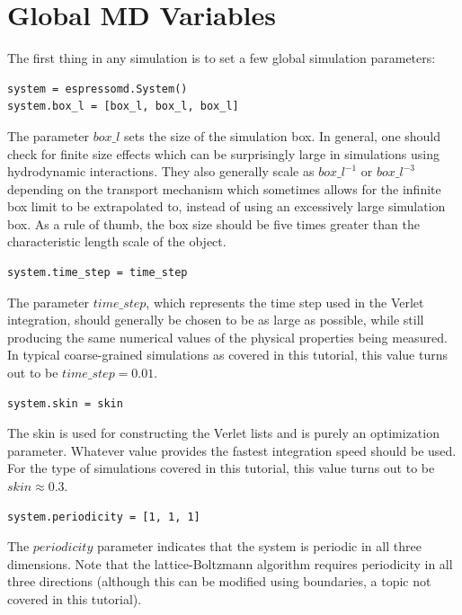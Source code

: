 \documentclass[
paper=a4,                       %
fontsize=11pt,                  %
twoside,                        %
footsepline,                    %
headsepline,                    %
headinclude=false,              %
footinclude=false,              %
pagesize,                       %
]{scrartcl}
\begin{document}
\section{Global MD Variables}\label{sec:espresso}

  The first thing in any \es{} simulation is to set a few global simulation parameters:

{\small\vspace{0,2cm}
\begin{lstlisting}
system = espressomd.System()
system.box_l = [box_l, box_l, box_l]
\end{lstlisting}\vspace{0,2cm}
}

The parameter $box\_l$ sets the size of the simulation box. In general, one should check for finite
size effects which can be surprisingly large in simulations using hydrodynamic interactions. They
also generally scale as $box\_l^{-1}$ or $box\_l^{-3}$ depending on the transport mechanism
which sometimes allows for the infinite box limit to be extrapolated to, instead of using an
excessively large simulation box. As a rule of thumb, the box size should be five times greater than the characteristic
length scale of the object. 
{\small\vspace{0,2cm}
\begin{lstlisting}[numbers=none]
system.time_step = time_step
\end{lstlisting}\vspace{0,2cm}
}
The parameter $time\_step$, which represents the time step used in the Verlet
integration, should generally be chosen to be as large as possible, while still producing the same numerical
values of the physical properties being measured. In typical coarse-grained simulations as
covered in this tutorial, this value turns out to be $time\_step=0.01$.
{\small\vspace{0,2cm}
\begin{lstlisting}[numbers=none]
system.skin = skin
\end{lstlisting}\vspace{0,2cm}
}
 The skin is used for constructing
the Verlet lists and is purely an optimization parameter. Whatever value provides the fastest
integration speed should be used. For the type of simulations covered in this tutorial, this value turns out
to be $skin \approx 0.3$.
{\small\vspace{0,2cm}
\begin{lstlisting}[numbers=none]
system.periodicity = [1, 1, 1]
\end{lstlisting}\vspace{0,2cm}
}
The $periodicity$ parameter indicates that the system is periodic in all three
dimensions. Note that the lattice-Boltzmann algorithm requires periodicity in all three directions (although
this can be modified using boundaries, a topic not covered in this tutorial). 
\end{document}
